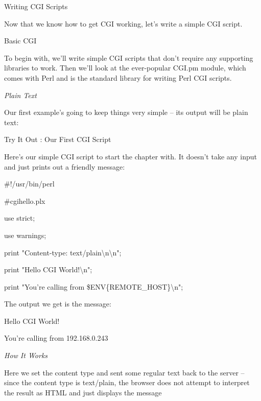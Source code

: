 \documentclass[a4paper,11pt]{book}
\begin{document}
\noindent 

\noindent 

\noindent Writing CGI Scripts

\noindent 

\noindent Now that we know how to get CGI working, let's write a simple CGI script.

\noindent 

\noindent Basic CGI

\noindent 

\noindent To begin with, we'll write simple CGI scripts that don't require any supporting libraries to work. Then we'll look at the ever-popular CGI.pm module, which comes with Perl and is the standard library for writing Perl CGI scripts.

\noindent 

\noindent 

\noindent \textit{Plain Text}

\noindent Our first example's going to keep things very simple -- its output will be plain text:

\noindent 

\noindent Try It Out : Our First CGI Script

\noindent Here's our simple CGI script to start the chapter with. It doesn't take any input and just prints out a friendly message:

\noindent 

\noindent \#!/usr/bin/perl

\noindent \#cgihello.plx

\noindent use strict;

\noindent use warnings;

\noindent 

\noindent print "Content-type: text/plain\textbackslash n\textbackslash n";

\noindent print "Hello CGI World!\textbackslash n";

\noindent print "You're calling from \$ENV\{REMOTE\_HOST\}\textbackslash n";

\noindent 

\noindent The output we get is the message:

\noindent 

\noindent Hello CGI World!

\noindent You're calling from 192.168.0.243

\noindent 

\noindent \textit{How It Works}

\noindent Here we set the content type and sent some regular text back to the server -- since the content type is text/plain, the browser does not attempt to interpret the result as HTML and just displays the message
\end{document}
